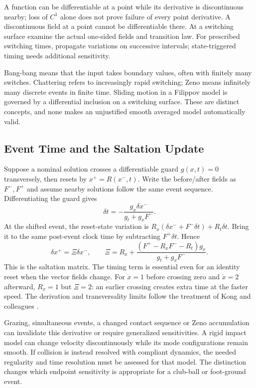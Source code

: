 A function can be differentiable at a point while its derivative is discontinuous nearby;
loss of $C^1$ alone does not prove failure of every point derivative. A discontinuous
field at a point cannot be differentiable there. At a switching surface examine the
actual one-sided fields and transition law. For prescribed switching times, propagate
variations on successive intervals; state-triggered timing needs additional sensitivity.

Bang-bang means that the input takes boundary values, often with finitely many switches.
Chattering refers to increasingly rapid switching; Zeno means infinitely many discrete
events in finite time. Sliding motion in a Filippov model is governed by a differential
inclusion on a switching surface. These are distinct concepts, and none makes an
unjustified smooth averaged model automatically valid.

\subsection{Event Time and the Saltation Update}

Suppose a nominal solution crosses a differentiable guard $g(x,t)=0$ transversely, then
resets by $x^+=R(x^-,t)$. Write the before/after fields as $F^-,F^+$ and assume nearby
solutions follow the same event sequence. Differentiating the guard gives
\[
\delta t=-\frac{g_x\delta x^-}{g_t+g_xF^-}.
\]
At the shifted event, the reset-state variation is
$R_x(\delta x^-+F^-\delta t)+R_t\delta t$. Bring it to the same post-event clock time by
subtracting $F^+\delta t$. Hence
\[
\delta x^+=\Xi\delta x^-,\qquad
\Xi=R_x+\frac{(F^+-R_xF^--R_t)g_x}{g_t+g_xF^-}.
\]
This is the saltation matrix. The timing term is essential even for an identity reset
when the vector fields change. For $\dot x=1$ before crossing zero and $\dot x=2$ afterward,
$R_x=1$ but $\Xi=2$: an earlier crossing creates extra time at the faster speed. The
derivation and transversality limits follow the treatment of Kong and colleagues
\cite{Kong2024SaltationFoundations}.

Grazing, simultaneous events, a changed contact sequence or Zeno accumulation can invalidate
this derivative or require generalized sensitivities. A rigid impact model can change
velocity discontinuously while its mode configurations remain smooth. If collision is
instead resolved with compliant dynamics, the needed regularity and time resolution
must be assessed for that model. The distinction changes which endpoint sensitivity
is appropriate for a club-ball or foot-ground event.

